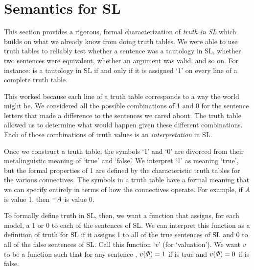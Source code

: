 

\section{Semantics for SL}
\label{sec.semanticsSL}

This section provides a rigorous, formal characterization of \emph{truth in SL} which builds on what we already know from doing truth tables. We were able to use truth tables to reliably test whether a sentence was a tautology in SL, whether two sentences were equivalent, whether an argument was valid, and so on. For instance: \metaA{} is a tautology in SL if and only if it is assigned `1' on every line of a complete truth table.

This worked because each line of a truth table corresponds to a way the world might be. We considered all the possible combinations of 1 and 0 for the sentence letters that made a difference to the sentences we cared about. The truth table allowed us to determine what would happen given these different combinations. Each of those combinations of truth values is an \emph{interpretation} in SL.

Once we construct a truth table, the symbols `1' and `0' are divorced from their metalinguistic meaning of `true' and `false'. We interpret `1' as meaning `true', but the formal properties of 1 are defined by the characteristic truth tables for the various connectives.  The symbols in a truth table have a formal meaning that we can specify entirely in terms of how the connectives operate. For example, if $A$ is value 1, then $\neg A$ is value 0.

To formally define truth in SL, then, we want a function that assigns, for each model, a 1 or 0 to each of the sentences of SL. We can interpret this function as a definition of truth for SL if it assigns 1 to all of the true sentences of SL and 0 to all of the false sentences of SL. Call this function `$v$' (for `valuation'). We want $v$ to be a function such that for any sentence \metaA{}, $v(\varPhi{})=1$ if \metaA{} is true and $v(\varPhi{})=0$ if \metaA{} is false.

